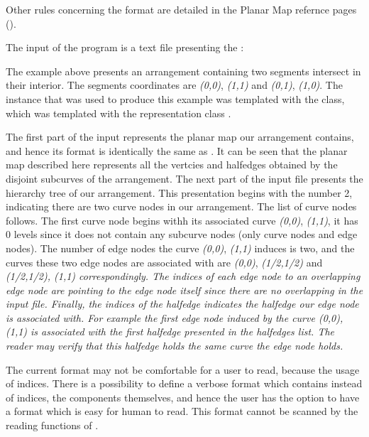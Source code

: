 \begin{ccAdvanced}
Other rules concerning the format are detailed in the Planar Map 
refernce pages ().


\label{ARR_sec:example11}

The input of the program is a text file presenting the :

The example above presents an arrangement containing two segments intersect in their interior.
The segments coordinates are {\em (0,0)}, {\em (1,1)}  and {\em (0,1)}, {\em (1,0)}. 
The  instance that was used to produce this example was templated 
with the  class, which was templated with the representation 
class .

The first part of the input represents the planar map our arrangement contains, and hence its format 
is identically the same as . It can be seen that the planar map described here 
represents all the vertcies and halfedges obtained by the disjoint subcurves of the arrangement.
The next part of the input file presents the hierarchy tree of our arrangement. 
This presentation begins with the number 2, indicating there are two 
curve nodes in our arrangement. The list of curve nodes follows.
The first curve node begins withh its associated curve {\em (0,0)}, {\em (1,1)}, it has 0 levels since 
it does not contain any subcurve nodes (only curve nodes and edge nodes). 
The number of edge nodes the curve {\em (0,0)}, {\em (1,1)} induces is two, 
and the curves these two edge nodes are associated with are 
{\em (0,0)}, {\em (1/2,1/2)} and \em{(1/2,1/2)}, \em{(1,1)} correspondingly. 
The indices of each edge node to an overlapping edge node are pointing to the edge node 
itself since there are no overlapping in the input file. 
Finally, the indices of the halfedge indicates the halfedge our edge node is associated with. 
For example the first edge node induced by the curve {\em (0,0)}, {\em (1,1)} is associated 
with the first halfedge presented in the halfedges list. The reader may verify that this halfedge 
holds the same curve the edge node holds.

The current format may not be comfortable for a user to read, because the usage of indices. 
There is a possibility to define a verbose format which contains instead of 
indices, the components themselves, and hence the user has the option to have a format 
which is easy for human to read.
This format cannot be scanned by the reading functions of .


\end{ccAdvanced}
